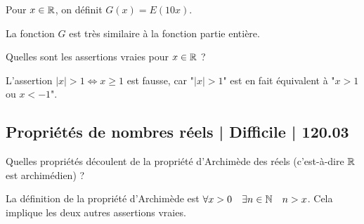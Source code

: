 \begin{question}
Pour $x\in \mathbb{R}$, on définit $G(x) = E(10x)$.
\begin{answers}




\end{answers}
\begin{explanations}
La fonction $G$ est très similaire à la fonction partie entière.
\end{explanations}
\end{question}


\begin{question}
Quelles sont les assertions vraies pour $x\in\mathbb{R}$ ?
\begin{answers}



\end{answers}
\begin{explanations}
L'assertion $|x|>1 \iff x \ge 1$ est fausse, car  "$|x| >1$" est en fait équivalent à "$x>1$ ou $x<-1$".
\end{explanations}
\end{question}


\subsection{Propriétés de nombres réels | Difficile | 120.03}


\begin{question}
Quelles propriétés découlent de la propriété d’Archimède des réels (c'est-à-dire $\mathbb{R}$ est archimédien) ?
\begin{answers}



\end{answers}
\begin{explanations}
La définition de la propriété d'Archimède est $\forall x>0 \quad \exists n \in\mathbb{N} \quad n>x$. Cela implique les deux autres assertions vraies.
\end{explanations}
\end{question}


